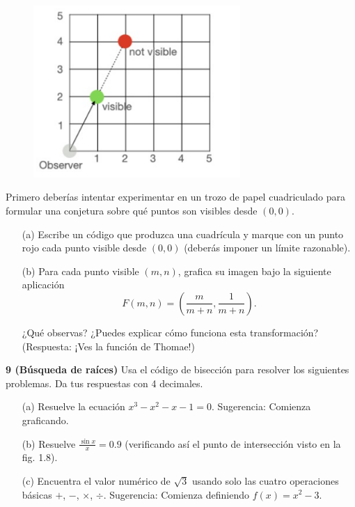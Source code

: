\documentclass{article}
\begin{document}
\begin{figure}[h]
    \centering
    \includegraphics[width=0.7\textwidth]{pictures/visible.png}
    \label{fig:8img}
\end{figure}


Primero deberías intentar experimentar en un trozo de papel cuadriculado para formular una conjetura sobre qué puntos son visibles desde \((0, 0)\).

\begin{itemize}
    \item[(a)] Escribe un código que produzca una cuadrícula y marque con un punto rojo cada punto visible desde \((0,0)\) (deberás imponer un límite razonable).
    
    \item[(b)] Para cada punto visible \((m, n)\), grafica su imagen bajo la siguiente aplicación
    \[
    F(m, n) = \left( \frac{m}{m + n}, \frac{1}{m + n} \right).
    \]
    
    ¿Qué observas? ¿Puedes explicar cómo funciona esta transformación?  
    (Respuesta: ¡Ves la función de Thomae!)
\end{itemize}


\textbf{9 (Búsqueda de raíces)} Usa el código de bisección para resolver los siguientes problemas. Da tus respuestas con 4 decimales.

\begin{itemize}
    \item[(a)] Resuelve la ecuación \(x^3 - x^2 - x - 1 = 0\).  
    Sugerencia: Comienza graficando.
    
    \item[(b)] Resuelve \(\frac{\sin x}{x} = 0.9\) (verificando así el punto de intersección visto en la fig. 1.8).
    
    \item[(c)] Encuentra el valor numérico de \(\sqrt{3}\) usando solo las cuatro operaciones básicas \(+\), \(-\), \(\times\), \(\div\).  
    Sugerencia: Comienza definiendo \(f(x) = x^2 - 3\).
\end{itemize}
\end{document}

